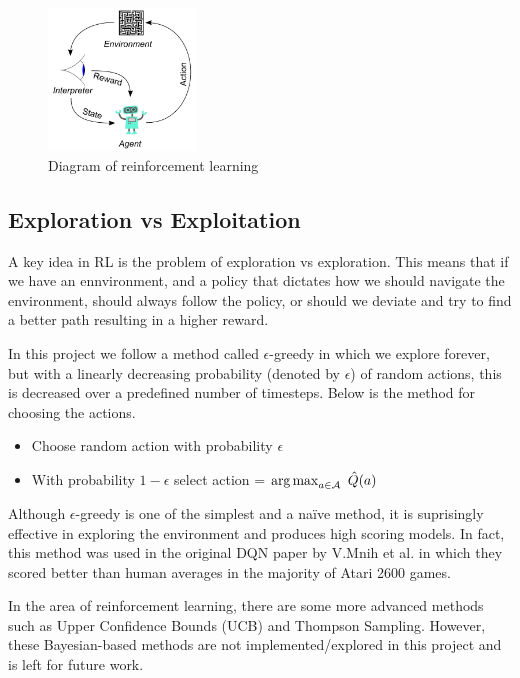 \begin{figure}[htbp]
	\centering
	\includegraphics[width=0.35\textwidth]{chapters/chapter3/images/rl.jpg}
	\caption{Diagram of reinforcement learning
		\label{fig:rl-diagram}
	}
\end{figure}

\subsection{Exploration vs Exploitation}
\label{dsgn:sec:rl:expt-v-explor}
A key idea in RL is the problem of exploration vs exploration. This means that if we have an ennvironment, and a policy that dictates how we should navigate the environment, should always follow the policy, or should we deviate and try to find a better path resulting in a higher reward.

In this project we follow a method called $\epsilon$-greedy in which we explore forever, but with a linearly decreasing probability (denoted by $\epsilon$) of random actions, this is decreased over a predefined number of timesteps. Below is the method for choosing the actions.

\begin{center}
	\begin{itemize}
		\item Choose random action with probability $\epsilon$
		\item With probability $1 - \epsilon$ select action = $\operatorname*{arg\,max}_{a \in \mathcal{A}}~\hat{Q}(a)$
	\end{itemize}
\end{center}

Although $\epsilon$-greedy is one of the simplest and a naïve method, it is suprisingly effective in exploring the environment and produces high scoring models. In fact, this method was used in the original DQN paper by V.Mnih et al. in which they scored better than human averages in the majority of Atari 2600 games.

In the area of reinforcement learning, there are some more advanced methods such as Upper Confidence Bounds (UCB) and Thompson Sampling. However, these Bayesian-based methods are not implemented/explored in this project and is left for future work.

